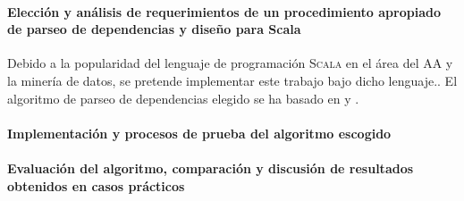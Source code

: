 \paragraph{Elección y análisis de requerimientos de un procedimiento apropiado de
  parseo de dependencias y diseño para Scala}
Debido a la popularidad del lenguaje de programación \textsc{Scala} en el área
del \ac{AA} y la minería de datos, se pretende implementar este trabajo bajo
dicho lenguaje.. El algoritmo de parseo de dependencias
elegido se ha basado en \citeauthor{yamada2003} \cite{yamada2003} y
\citeauthor{rohit2016} \cite{rohit2016}.

\paragraph{Implementación y procesos de prueba del algoritmo escogido}



\paragraph{Evaluación del algoritmo, comparación y discusión de resultados
  obtenidos en casos prácticos}


